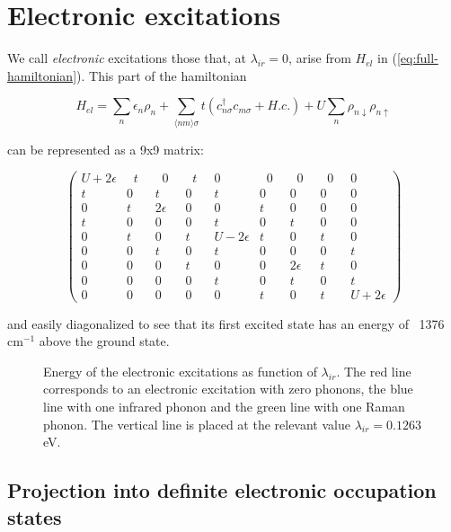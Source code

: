 \chapter{Electronic excitations}
\label{chap:electronic}

We call \textit{electronic} excitations those that, at $\lambda_{ir}=0$, arise from $H_{el}$ in (\ref{eq:full-hamiltonian}). This part of the hamiltonian

\begin{equation}\label{eq:Hel} H_{el} = \sum_n \epsilon_n \rho_n + \sum_{ \langle nm \rangle \sigma } t (c_{n \sigma }^\dagger c_{m \sigma } + H.c.) + U\sum_n \rho_{n\downarrow}\rho_{n\uparrow} \end{equation}

can be represented  as a 9x9 matrix:

\begin{equation}\label{eq:Hel-matrix} \left( \begin{array}{ccccccccc} 
U+2\epsilon &\;\;t\;\;&\;\;0\;\;&\;\;t\;\;&0&\;\;0\;\;&\;\;0\;\;&\;\;0\;\;&0 \\
t&0&t&0&t&0&0&0&0 \\
0&t&2\epsilon &0&0&t&0&0&0 \\
t&0&0&0&t&0&t&0&0 \\
0&t&0&t&U-2\epsilon &t&0&t&0 \\
0&0&t&0&t&0&0&0&t \\
0&0&0&t&0&0&2\epsilon &t&0 \\
0&0&0&0&t&0&t&0&t \\
0&0&0&0&0&t&0&t&U+2\epsilon  \end{array} \right)\end{equation}

and easily diagonalized to see that its first excited state has an energy of ~1376 cm$^{-1}$ above the  ground state.

\begin{figure}
  \centering
  
  \caption[Energy of the electronic excitations as function of $\lambda_{ir}$.]
  {Energy of the electronic excitations as function of $\lambda_{ir}$. 
    The red line corresponds to an electronic excitation with zero phonons, the blue line with one infrared phonon and the green line with one Raman phonon.
    The vertical line is placed at the relevant value $\lambda_{ir}=0.1263$ eV.}
  \label{fig:electrSpectra}
\end{figure}

\section{Projection into definite electronic occupation states}

